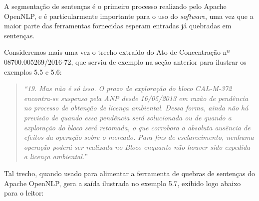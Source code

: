 \documentclass[11pt]{report}
\newcommand{\quotes}[1]{``#1''}
\begin{document}
A segmentação de
sentenças é o primeiro processo realizado pelo Apache OpenNLP, e é particularmente importante para o uso do \textit{software}, uma vez que a maior parte das ferramentas fornecidas esperam
entradas já quebradas em sentenças.

Consideremos mais uma vez o trecho extraído do Ato de Concentração nº 08700.005269/2016-72, que serviu de exemplo na seção anterior para ilustrar os exemplos 5.5 e 5.6:

\begin{quote}
  \textit{\quotes{19. Mas não é só isso. O prazo de exploração do bloco CAL-M-372 encontra-se suspenso pela ANP desde 16/05/2013 em razão de pendência no processo de obtenção de licença ambiental. Dessa forma, ainda não há previsão de quando essa pendência será solucionada ou de quando a exploração do bloco será retomada, o que corrobora a absoluta ausência de efeitos da operação sobre o mercado. Para fins de esclarecimento, nenhuma operação poderá ser realizada no Bloco enquanto não houver sido expedida a licença ambiental.}}
\end{quote}

Tal trecho, quando usado para alimentar a ferramenta de quebras de sentenças do Apache OpenNLP, gera a saída ilustrada no exemplo 5.7, exibido logo abaixo para o leitor:

\begin{quote}
\end{quote}

\begin{quote}
\end{quote}

\begin{quote}
\end{quote}

\begin{quote}
\end{quote}
\end{document}

